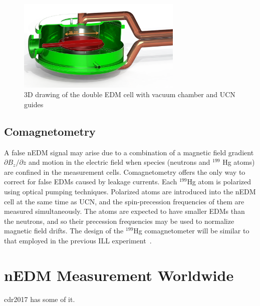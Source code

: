 \begin{figure}[h!]
  \centering
  \includegraphics[width=0.7\textwidth]{HVcell.png}
  \caption{3D drawing of the double EDM cell with vacuum chamber and
    UCN guides}
  \label{fig:HVcell}
\end{figure}



\subsection{Comagnetometry}
A false nEDM signal may arise due to a combination of a magnetic field
gradient $\partial {B_z}/\partial z$ and motion in the electric field when
species (neutrons and $^{199}$ Hg atoms) are confined in the
measurement cells. Comagnetometry offers the only way to correct for
false EDMs caused by leakage currents.  Each $^{199}$Hg atom is
polarized using optical pumping techniques. Polarized atoms are
introduced into the nEDM cell at the same time as UCN, and the
spin-precession frequencies of them are measured simultaneously. The
atoms are expected to have smaller EDMs than the neutrons, and so
their precession frequencies may be used to normalize magnetic field
drifts.  The design of the $^{199}$Hg comagnetometer will be similar
to that employed in the previous ILL
experiment~\cite{Baker2006,Griffith2009}.

\section{ nEDM Measurement Worldwide}
cdr2017 has some of it. 




